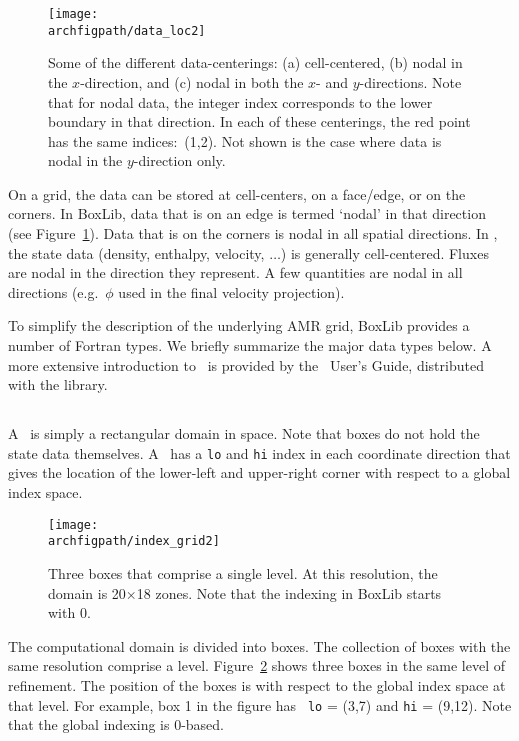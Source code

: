 \begin{figure}[t]
\centering
\texttt{[image: \\archfigpath/data\_loc2]}
\caption[Data-centerings on the grid]
  {\label{fig:dataloc} Some of the different data-centerings:
  (a) cell-centered, (b) nodal in the $x$-direction, and (c) nodal in
  both the $x$- and $y$-directions.  Note that for nodal data, the
  integer index corresponds to the lower boundary in that direction.
  In each of these centerings, the red point has the same indices:\ (1,2).
  Not shown is the case where data is nodal in the $y$-direction only.}
\end{figure}
On a grid, the data can be stored at cell-centers, on a face/edge, or
on the corners.  In BoxLib, data that is on an edge is termed `nodal'
in that direction (see Figure~\ref{fig:dataloc}).  Data that is on the
corners is nodal in all spatial directions.  In \maestro, the state
data (density, enthalpy, velocity, $\ldots$) is generally
cell-centered.  Fluxes are nodal in the direction they represent.
A few quantities are nodal in all directions (e.g.\ $\phi$ used in
the final velocity projection).

To simplify the description of the underlying AMR grid, BoxLib
provides a number of Fortran types.  We briefly summarize the major
data types below.  A more extensive introduction to \boxlib\ is 
provided by the \boxlib\ User's Guide, distributed with the library.


\subsection{\boxtype}

A \boxtype\ is simply a rectangular domain in space.  Note that boxes
do not hold the state data themselves.  A \boxtype\ has a {\tt lo} 
and {\tt hi} index in each coordinate direction that gives the
location of the lower-left and upper-right corner with respect to
a global index space.  

\begin{figure}[t]
\centering
\texttt{[image: \\archfigpath/index\_grid2]}
\caption[Single-level grid structure]
{\label{fig:boxes} Three boxes that comprise a single level.  At this
  resolution, the domain is 20$\times$18 zones.  Note that the
  indexing in BoxLib starts with $0$.}
\end{figure}


The computational domain is divided into boxes.  The collection of
boxes with the same resolution comprise a level.
Figure~\ref{fig:boxes} shows three boxes in the same level of
refinement.  The position of the boxes is with respect to the global
index space at that level.  For example, box 1 in the figure has {\tt
  lo} = (3,7) and {\tt hi} = (9,12).  Note that the global indexing
is 0-based.

